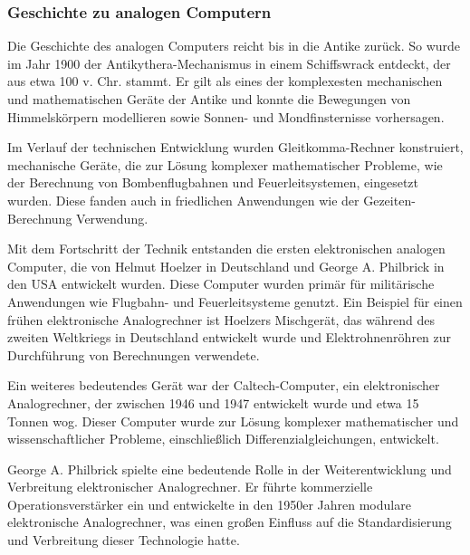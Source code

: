 \subsubsection{Geschichte zu analogen Computern}

Die Geschichte des analogen Computers reicht bis in die Antike zurück. So wurde im Jahr 1900 der Antikythera-Mechanismus in einem Schiffswrack entdeckt, der aus etwa 100 v. Chr. stammt. Er gilt als eines der komplexesten mechanischen und mathematischen Geräte der Antike und konnte die Bewegungen von Himmelskörpern modellieren sowie Sonnen- und Mondfinsternisse vorhersagen. \cite[vgl. S. 9 f.]{Ulmann2022}

Im Verlauf der technischen Entwicklung wurden Gleitkomma-Rechner konstruiert, mechanische Geräte, die zur Lösung komplexer mathematischer Probleme, wie der Berechnung von Bombenflugbahnen und Feuerleitsystemen, eingesetzt wurden. Diese fanden auch in friedlichen Anwendungen wie der Gezeiten-Berechnung Verwendung. \cite[vgl. S. 9]{Ulmann2022}

Mit dem Fortschritt der Technik entstanden die ersten elektronischen analogen Computer, die von Helmut Hoelzer in Deutschland und George A. Philbrick in den USA entwickelt wurden. Diese Computer wurden primär für militärische Anwendungen wie Flugbahn- und Feuerleitsysteme genutzt. Ein Beispiel für einen frühen elektronische Analogrechner ist Hoelzers Mischgerät, das während des zweiten Weltkriegs in Deutschland entwickelt wurde und Elektrohnenröhren zur Durchführung von Berechnungen verwendete. \cite[vgl. S. 41 f.]{Ulmann2022}

Ein weiteres bedeutendes Gerät war der Caltech-Computer, ein elektronischer Analogrechner, der zwischen 1946 und 1947 entwickelt wurde und etwa 15 Tonnen wog. Dieser Computer wurde zur Lösung komplexer mathematischer und wissenschaftlicher Probleme, einschließlich Differenzialgleichungen, entwickelt. \cite[vgl. S. 69]{Ulmann2022}

George A. Philbrick spielte eine bedeutende Rolle in der Weiterentwicklung und Verbreitung elektronischer Analogrechner. Er führte kommerzielle Operationsverstärker ein und entwickelte in den 1950er Jahren modulare elektronische Analogrechner, was einen großen Einfluss auf die Standardisierung und Verbreitung dieser Technologie hatte. \cite[vgl. S. 136]{Ulmann2022}

